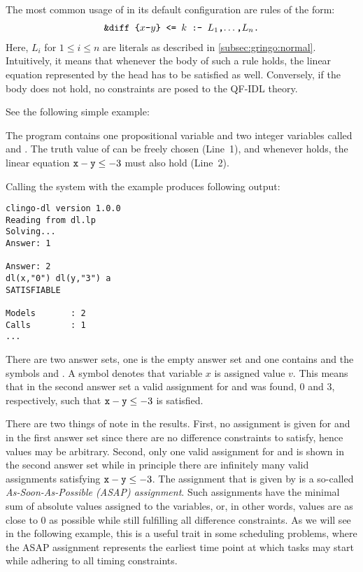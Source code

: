 The most common usage of  in its default configuration are rules of the form:
  \begin{align*}
    \texttt{\&diff\text{ }\{$x$-$y$\}\text{ }<=\text{ }$k$ :- $L_1$,$\dots$,$L_n$.}
  \end{align*}
Here, $L_i$ for $1\leq i \leq n$ are literals as described in \ref{subsec:gringo:normal}.
Intuitively, it means that whenever the body of such a rule holds, 
the linear equation represented by the head has to be satisfied as well.
Conversely, if the body does not hold, no constraints are posed to the QF-IDL theory.
\begin{example}\label{ex:dl:simple}
         See the following simple example:
         
The program contains one propositional variable  and two integer variables called  and .
The truth value of  can be freely chosen (Line~1),
and whenever  holds, the linear equation $\texttt{x}-\texttt{y}\leq -3$ must also hold (Line~2).

Calling the system with the example produces following output:
\begin{lstlisting}[numbers=none]
clingo-dl version 1.0.0
Reading from dl.lp
Solving...
Answer: 1

Answer: 2
dl(x,"0") dl(y,"3") a
SATISFIABLE

Models       : 2
Calls        : 1
...
\end{lstlisting}
There are two answer sets, one is the empty answer set and one contains  and the symbols  and .
A symbol  denotes that variable $x$ is assigned value $v$.
This means that in the second answer set a valid assignment for  and  was found,
0 and 3, respectively, such that $\texttt{x}-\texttt{y}\leq -3$ is satisfied.

There are two things of note in the results.
First, no assignment is given for  and  in the first answer set since there are no difference constraints to satisfy,
hence values may be arbitrary.
Second, only one valid assignment for  and  is shown in the second answer set 
while in principle there are infinitely many valid assignments satisfying $\texttt{x}-\texttt{y}\leq -3$.
The assignment that is given by  is a so-called \emph{As-Soon-As-Possible (ASAP) assignment}.
Such assignments have the minimal sum of absolute values assigned to the variables,
or, in other words, values are as close to 0 as possible while still fulfilling all difference constraints.
As we will see in the following example, this is a useful trait in some scheduling problems,
where the ASAP assignment represents the earliest time point at which tasks may start while adhering to all timing constraints.

 \end{example}


